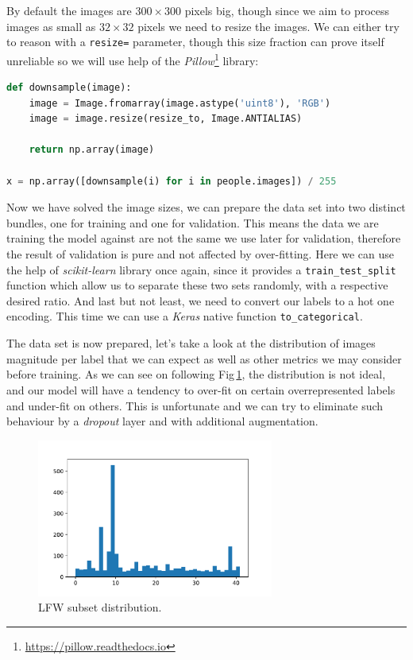 By default the images are $300\times300$ pixels big, though since we aim to process images as small as $32\times32$ pixels we need to resize the images. We can either try to reason with a \texttt{resize=} parameter, though this size fraction can prove itself unreliable so we will use help of the \textit{Pillow}\footnote{\url{https://pillow.readthedocs.io}} library:

\begin{lstlisting}[language=Python, caption=Pre-processing of the data set.]
def downsample(image):
    image = Image.fromarray(image.astype('uint8'), 'RGB')
    image = image.resize(resize_to, Image.ANTIALIAS)

    return np.array(image)

x = np.array([downsample(i) for i in people.images]) / 255
\end{lstlisting}

Now we have solved the image sizes, we can prepare the data set into two distinct bundles, one for training and one for validation. This means the data we are training the model against are not the same we use later for validation, therefore the result of validation is pure and not affected by over-fitting. Here we can use the help of \textit{scikit-learn} library once again, since it provides a \texttt{train\_test\_split} function which allow us to separate these two sets randomly, with a respective desired ratio. And last but not least, we need to convert our labels to a hot one encoding. This time we can use a \textit{Keras} native function \texttt{to\_categorical}.

The data set is now prepared, let's take a look at the distribution of images magnitude per label that we can expect as well as other metrics we may consider before training. As we can see on following Fig\,\ref{fig:lfw_distribution}, the distribution is not ideal, and our model will have a tendency to over-fit on certain overrepresented labels and under-fit on others. This is unfortunate and we can try to eliminate such behaviour by a \textit{dropout} layer and with additional augmentation.

\begin{figure}[ht]
    \centering
    \includegraphics[height=14em]{obrazky-figures/lfw_distribution.pdf}
    \caption{LFW subset distribution.}
    \label{fig:lfw_distribution}
\end{figure}

